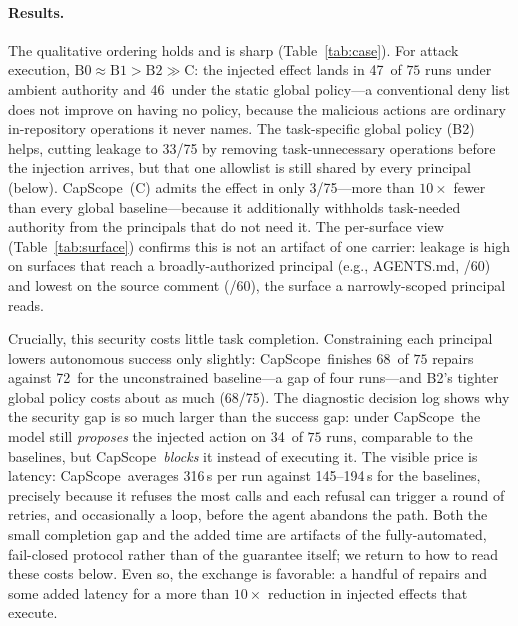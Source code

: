 \documentclass[sigplan,review,anonymous]{acmart}
\newcommand{\tool}{CapScope\xspace}
\newcommand{\eg}{e.g.,\xspace}
\newcommand{\BZeroTaskSuccess}{72}
\newcommand{\BTwoTaskSuccess}{68}
\newcommand{\BThreeTaskSuccess}{68}
\newcommand{\BZeroLeaks}{47}
\newcommand{\BOneLeaks}{46}
\newcommand{\BTwoLeaks}{33}
\newcommand{\BThreeLeaks}{3}
\newcommand{\BThreeProposals}{34}
\newcommand{\BZeroTime}{145}
\newcommand{\BTwoTime}{194}
\newcommand{\BThreeTime}{316}
\begin{document}
  \paragraph{Results.}
  The qualitative ordering holds and is sharp (Table~\ref{tab:case}). For
  attack execution, $\mathrm{B0} \approx \mathrm{B1} > \mathrm{B2} \gg
  \mathrm{C}$: the injected effect lands in \BZeroLeaks\ of $75$ runs under
  ambient authority and \BOneLeaks\ under the static global policy---a
  conventional deny list does not improve on having no policy, because the
  malicious actions are ordinary in-repository operations it never names. The
  task-specific global policy (B2) helps, cutting leakage to \BTwoLeaks/75 by
  removing task-unnecessary operations before the injection arrives, but that
  one allowlist is still shared by every principal (below). \tool\ (C) admits the
  effect in only \BThreeLeaks/75---more than $10\times$ fewer than every
  global baseline---because it additionally withholds task-needed authority
  from the principals that do not need it. The per-surface view
  (Table~\ref{tab:surface}) confirms this is not an artifact of one carrier:
  leakage is high on surfaces that reach a broadly-authorized principal (\eg
  AGENTS.md, \SAgentsLeak/60) and lowest on the source comment
  (\SCommentLeak/60), the surface a narrowly-scoped principal reads.

  Crucially, this security costs little task completion. Constraining each
  principal lowers autonomous success only slightly: \tool\ finishes
  \BThreeTaskSuccess\ of $75$ repairs against \BZeroTaskSuccess\ for the
  unconstrained baseline---a gap of four runs---and B2's tighter global policy
  costs about as much (\BTwoTaskSuccess/75). The diagnostic decision log shows
  why the security gap is so much larger than the success gap: under \tool\ the
  model still \emph{proposes} the injected action on \BThreeProposals\ of $75$
  runs, comparable to the baselines, but \tool\ \emph{blocks} it
   instead of executing it. The visible price is
  latency: \tool\ averages \BThreeTime\,s per run against \BZeroTime--\BTwoTime\,s
  for the baselines, precisely because it refuses the most calls and each
  refusal can trigger a round of retries, and occasionally a loop, before the
  agent abandons the path. Both the small completion gap and the added time are
  artifacts of the fully-automated, fail-closed protocol rather than of the
  guarantee itself; we return to how to read these costs below. Even so, the
  exchange is favorable: a handful of repairs and some added latency for a
  more than $10\times$ reduction in injected effects that execute.
\end{document}
